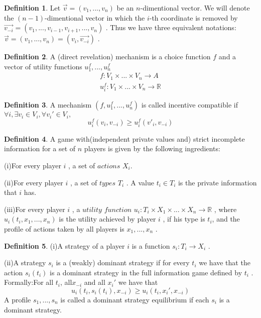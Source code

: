 \documentclass[10pt,reqno]{amsart}
\theoremstyle{definition}
\newtheorem{defn}{Definition}[section]
\theoremstyle{remark}
\numberwithin{equation}{section}
\begin{document}
\begin{defn}
Let $\vec{v}=(v_1,...,v_n)$ be an $n$-dimentional vector. We will denote the $(n-1)$-dimentional vector in which the $i$-th coordinate is removed by $\vec{v_{-i}}=(v_1,...,v_{i-1},v_{i+1},...,v_n)$ . Thus we have three equivalent notations:$\vec{v}=(v_1,...,v_n)=(v_i,\vec{v_{-i}})$ .
\end{defn}


\begin{defn}
A (direct revelation) mechanism is a choice function $f$ and a vector of utility functions $u_1^f,...,u_n^f$
\begin{eqnarray}
f:V_1\times ... \times V_n \rightarrow A\\
u_i^f :V_1\times ... \times V_n \rightarrow \mathbb{R}
\end{eqnarray}
\end{defn}


\begin{defn}
A mechanism $(f,u_1^f,...,u_n^f) $ is called incentive compatible if $\forall i, \exists  v_i \in V_i, \forall v_i' \in V_i,  $  %
\begin{equation}
u_i^f(v_i,v_{-i} )\geq u_i^f(v'_i,v_{-i} )
\end{equation}
\end{defn}

\begin{defn}
A game with(independent private values and) strict incomplete information for a set of $n$ players is given by the following ingredients:

(i)For every player $i$ , a set of $actions$ $X_i$.

(ii)For every player $i$ , a set of $types$ $T_i$ . A value $t_i\in T_i$ is the private information that $i$ has.

(iii)For every player $i$ , a $utility$ $function$ $u_i: T_i \times X_1\times ...\times X_n\rightarrow \mathbb{R}$ , where $u_i(t_i,x_1,...,x_n)$ is the utility achieved by player $i$ , if his type is $t_i$, and the profile of actions taken by all players is $x_1,...,x_n$ . 
\end{defn}

\begin{defn}
(i)A strategy of a player $i$ is a function $s_i:T_i\rightarrow X_i$ .

(ii)A strategy $s_i$ is a (weakly) dominant strategy if for every $t_i$ we have that the action $s_i(t_i)$ is a dominant strategy in the full information game defined by $t_i$ . Formally:For all $t_i$, all$x_{-i}$ and all $x_i'$ we have that
\begin{equation}
 u_i(t_i,  s_i(t_i),x_{-i})\ge u_i(t_i, x_i',x_{-i})
\end{equation}
 A profile $s_1,...,s_n$ is called a dominant strategy equilibrium if each $s_i$ is a dominant strategy.
\end{defn}
\end{document}
